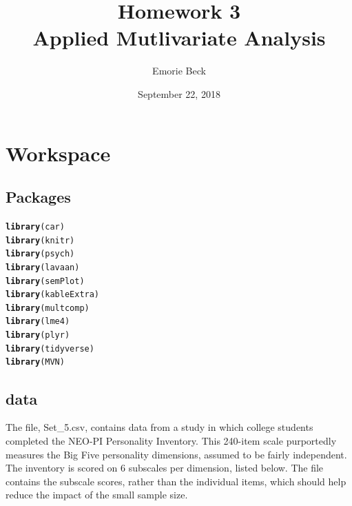\documentclass{article}\usepackage[]{graphicx}\usepackage[]{color}
\title{%
Homework 3\\
\large Applied Mutlivariate Analysis}
\date{September 22, 2018}
\author{Emorie Beck}
\makeatletter
\newcommand{\hlstd}[1]{\textcolor[rgb]{0.345,0.345,0.345}{#1}}%
\newcommand{\hlkwd}[1]{\textcolor[rgb]{0.737,0.353,0.396}{\textbf{#1}}}%
\newenvironment{kframe}{%
 \def\at@end@of@kframe{}%
 \ifinner\ifhmode%
  \def\at@end@of@kframe{\end{minipage}}%
  \begin{minipage}{\columnwidth}%
 \fi\fi%
 \def\FrameCommand##1{\hskip\@totalleftmargin \hskip-\fboxsep
 \colorbox{shadecolor}{##1}\hskip-\fboxsep
     \hskip-\linewidth \hskip-\@totalleftmargin \hskip\columnwidth}%
 \MakeFramed {\advance\hsize-\width
   \@totalleftmargin\z@ \linewidth\hsize
   \@setminipage}}%
 {\par\unskip\endMakeFramed%
 \at@end@of@kframe}
\newenvironment{knitrout}{}{} %
\makeatother
\begin{document}
\maketitle

\section{Workspace}
\subsection{Packages}



\begin{knitrout}
\color{fgcolor}\begin{kframe}
\begin{alltt}
\hlkwd{library}\hlstd{(car)}
\hlkwd{library}\hlstd{(knitr)}
\hlkwd{library}\hlstd{(psych)}
\hlkwd{library}\hlstd{(lavaan)}
\hlkwd{library}\hlstd{(semPlot)}
\hlkwd{library}\hlstd{(kableExtra)}
\hlkwd{library}\hlstd{(multcomp)}
\hlkwd{library}\hlstd{(lme4)}
\hlkwd{library}\hlstd{(plyr)}
\hlkwd{library}\hlstd{(tidyverse)}
\hlkwd{library}\hlstd{(MVN)}
\end{alltt}
\end{kframe}
\end{knitrout}



\subsection{data}
The file, Set\_5.csv, contains data from a study in which college students completed the NEO-PI Personality Inventory. This 240-item scale purportedly measures the Big Five personality dimensions, assumed to be fairly independent. The inventory is scored on 6 subscales per dimension, listed below. The file contains the subscale scores, rather than the individual items, which should help reduce the impact of the small sample size.\\
\end{document}
